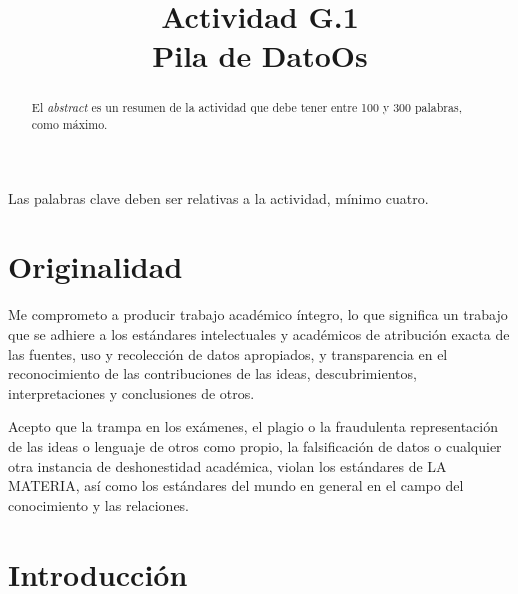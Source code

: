 \documentclass[conference]{IEEEtran}
\begin{document}
\title{Actividad G.1\\Pila de DatoOs
}

\author{
}

\maketitle

\begin{abstract}
El \textit{abstract} es un resumen de la actividad que debe tener entre 100 y 300 palabras, como máximo.
\end{abstract}

\begin{IEEEkeywords}
Las palabras clave deben ser relativas a la actividad, mínimo cuatro.
\end{IEEEkeywords}

\section{Originalidad}

   Me comprometo a producir trabajo académico íntegro, lo que significa un trabajo que se adhiere a los estándares intelectuales y académicos de atribución exacta de las fuentes, uso y recolección de datos apropiados, y transparencia en el reconocimiento de las contribuciones de las ideas, descubrimientos, interpretaciones y conclusiones de otros.

   Acepto que la trampa en los exámenes, el plagio o la fraudulenta representación de las ideas o lenguaje de otros como propio, la falsificación de datos o cualquier otra instancia de deshonestidad académica, violan los estándares de LA MATERIA, así como los estándares del mundo en general en el campo del conocimiento y las relaciones.


\section{Introducción}
\end{document}
